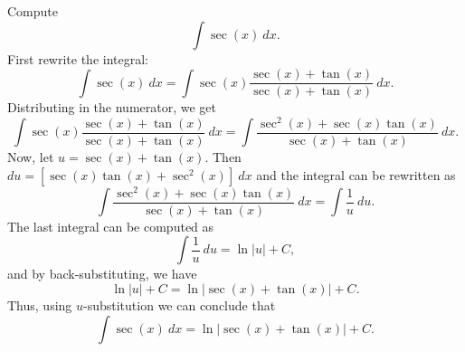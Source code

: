 \documentclass{ximera}
\begin{document}
\begin{example}[example 16] Compute 
\[\int \sec(x) \ dx.\]
First rewrite the integral:
\[\int \sec(x) \ dx =\int \sec(x)\frac{\sec(x)+\tan(x)}{\sec(x)+\tan(x)} \ dx.\]
Distributing in the numerator, we get
\[\int \sec(x)\frac{\sec(x)+\tan(x)}{\sec(x)+\tan(x)} \ dx = \int \frac{\sec^2(x)+\sec(x)\tan(x)}{\sec(x)+\tan(x)} \ dx.\]
Now, let $u = \sec(x) + \tan(x)$. Then $du = [\sec(x)\tan(x) + \sec^2(x)] \ dx$ and the integral can be rewritten as
\[ \int \frac{\sec^2(x)+\sec(x)\tan(x)}{\sec(x)+\tan(x)} \ dx = \int \frac{1}{u} \ du.\]
The last integral can be computed as
\[\int \frac{1}{u} \ du = \ln|u| + C,\]
and by back-substituting, we have 
\[\ln|u| + C = \ln|\sec(x) + \tan(x)| + C.\]
Thus, using $u$-substitution we can conclude that
\[\int \sec(x) \ dx =  \ln|\sec(x) + \tan(x)| + C.\]
\end{example}


\begin{center}
\begin{foldable}
\end{foldable}
\end{center}
\end{document}
